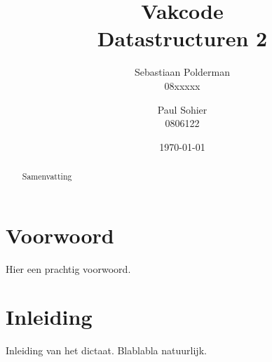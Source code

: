 \documentclass[a4paper,11pt]{report}
\begin{document}
\title{
  Vakcode\\
  Datastructuren 2
}
\author{
  Sebastiaan Polderman\\
  08xxxxx\\
  \and
  Paul Sohier\\
  0806122
}
\date{\today}
\maketitle
\begin{abstract}\centering
Samenvatting
\end{abstract}

\chapter{Voorwoord}
Hier een prachtig voorwoord. 

\tableofcontents

\chapter{Inleiding}
Inleiding van het dictaat. Blablabla natuurlijk. 





\appendix


\printindex

\end{document}
